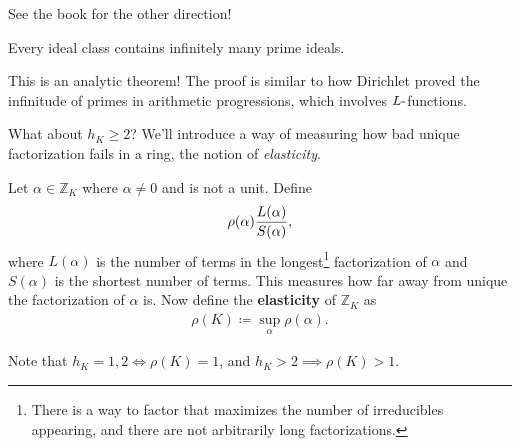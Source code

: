 \begin{remark}

See the book for the other direction!

\end{remark}

\begin{theorem}[Landau]

Every ideal class contains infinitely many prime ideals.

\end{theorem}

\begin{remark}

This is an analytic theorem! The proof is similar to how Dirichlet
proved the infinitude of primes in arithmetic progressions, which
involves \(L{\hbox{-}}\)functions.

\end{remark}

\begin{remark}

What about \(h_K \geq 2\)? We'll introduce a way of measuring how bad
unique factorization fails in a ring, the notion of \emph{elasticity}.

\end{remark}

\begin{definition}[?]

Let \(\alpha\in {\mathbb{Z}}_K\) where \(\alpha\neq 0\) and is not a
unit. Define
\begin{align*}
\rho(\alpha) { L( \alpha) \over S( \alpha) }
,\end{align*}
where \(L( \alpha)\) is the number of terms in the longest\footnote{There
  is a way to factor that maximizes the number of irreducibles
  appearing, and there are not arbitrarily long factorizations.}
factorization of \(\alpha\) and \(S( \alpha )\) is the shortest number
of terms. This measures how far away from unique the factorization of
\(\alpha\) is. Now define the \textbf{elasticity} of \({\mathbb{Z}}_K\)
as
\begin{align*}
\rho(K) \coloneqq\sup_{\alpha} \rho( \alpha)
.\end{align*}

\end{definition}

\begin{remark}

Note that \(h_K = 1, 2\iff \rho(K) = 1\), and
\(h_K > 2 \implies \rho(K) > 1\).

\end{remark}

